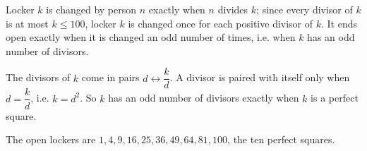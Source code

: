 Locker $k$ is changed by person $n$ exactly when $n$ divides $k$; since every divisor of $k$ is at most $k\le100$, locker $k$ is changed once for each positive divisor of $k$. It ends open exactly when it is changed an odd number of times, i.e. when $k$ has an odd number of divisors.

The divisors of $k$ come in pairs $d\leftrightarrow\dfrac kd$. A divisor is paired with itself only when $d=\dfrac kd$, i.e. $k=d^2$. So $k$ has an odd number of divisors exactly when $k$ is a perfect square.

The open lockers are $\boxed{1,4,9,16,25,36,49,64,81,100}$, the ten perfect squares.
